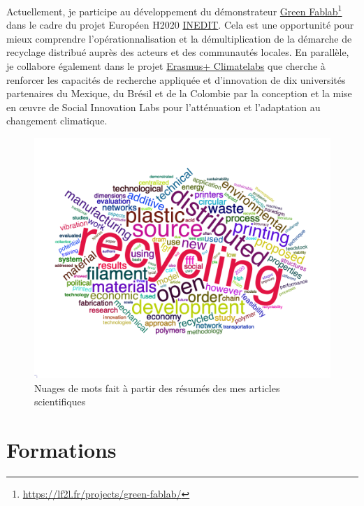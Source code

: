 \documentclass[
  12pt,
  oneside]{book}
\begin{document}
Actuellement, je participe au développement du démonstrateur \href{https://lf2l.fr/projects/green-fablab/}{Green Fablab}\footnote{\url{https://lf2l.fr/projects/green-fablab/}} dans le cadre du projet Européen H2020 \href{http://erpi.univ-lorraine.fr/projects/INEDIT/}{INEDIT}.
Cela est une opportunité pour mieux comprendre l'opérationnalisation et la démultiplication de la démarche de recyclage distribué auprès des acteurs et des communautés locales.
En parallèle, je collabore également dans le projet \href{https://erpi.univ-lorraine.fr/fr/projects/Climatelabs/}{Erasmus+ Climatelabs} que cherche à renforcer les capacités de recherche appliquée et d'innovation de dix universités partenaires du Mexique, du Brésil et de la Colombie par la conception et la mise en œuvre de Social Innovation Labs pour l'atténuation et l'adaptation au changement climatique.

\begin{figure}

{\centering \includegraphics[width=0.75\linewidth]{Figures/Cloud} 

}

\caption{Nuages de mots fait à partir des résumés des mes articles scientifiques}\label{fig:unnamed-chunk-2}
\end{figure}

\hypertarget{formations}{%
\section{Formations}\label{formations}}
\end{document}
